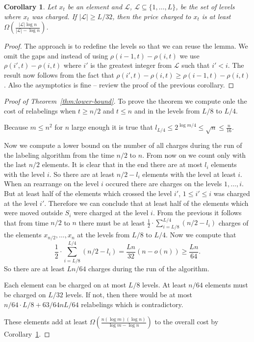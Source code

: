 \documentclass[11pt]{article} %
\newcommand{\density}[2]{\rho(#1, #2)}
\newtheorem{corollary}[definition]{Corollary}
\begin{document}
\begin{corollary}
\label{cor:element-charge}
Let $x_t$ be an element and $\mathcal{L}$, $\mathcal{L} \subseteq \{1, \dots, L\}$, be the set of levels where $x_t$ was charged.
If $|\mathcal{L}| \geq L/32$, then the price charged to $x_t$ is at least $\Omega\left(\frac{|\mathcal{L}| \log n}{|\mathcal{L}| - \log n}\right)$.
\end{corollary}
\begin{proof}
The approach is to redefine the levels so that we can reuse the lemma.
We omit the gaps and instead of using $\density{i - 1}{t} - \density{i}{t}$ we use $\density{i'}{t} - \density{i}{t}$ where $i'$ is the greatest integer from $\mathcal{L}$ such that $i' < i$.
The result now follows from the fact that $\density{i'}{t} - \density{i}{t} \geq \density{i - 1}{t} - \density{i}{t}$.
Also the asymptotics is fine -- review the proof of the previous corollary.
\end{proof}

\begin{proof}[Proof of Theorem~\ref{thm:lower-bound}]
To prove the theorem we compute onle the cost of relabelings when $t \geq n/2$ and $t \leq n$ and in the levels from $L/8$ to $L/4$.

Because $m \leq n^2$ for $n$ large enough it is true that $l_{L/4} \leq 2^{\log m / 4} \leq \sqrt{n} \leq \frac{n}{16}$.

Now we compute a lower bound on the number of all charges during the run of the labeling algorithm from the time $n/2$ to $n$.
From now on we count only with the last $n/2$ elements.
It is clear that in the end there are at most $l_i$ elements with the level $i$.
So there are at least $n/2 - l_i$ elements with the level at least $i$.
When an rearrange on the level $i$ occured there are charges on the levels $1, \dots, i$.
But at least half of the elements which crossed the level $i'$, $1 \leq i' \leq i$ was charged at the level $i'$.
Therefore we can conclude that at least half of the elements which were moved outside $S_i$ were charged at the level $i$.
From the previous it follows that from time $n/2$ to $n$ there must be at least $\frac{1}{2} \cdot \sum_{i = L/8}^{L/4}(n/2 - l_i)$ charges of the elements $x_{n/2}, \dots, x_n$ at the levels from $L/8$ to $L/4$.
Now we compute that
\[
\frac{1}{2} \cdot \sum_{i = L/8}^{L/4}(n/2 - l_i) = \frac{Ln}{32} (n - o(n)) \geq \frac{Ln}{64}.
\]
So there are at least $Ln/64$ charges during the run of the algorithm.

Each element can be charged on at most $L/8$ levels.
At least $n/64$ elements must be charged on $L/32$ levels.
If not, then there would be at most $n/64 \cdot L/8 + 63/64nL/64$ relabelings which is contradictory.

These elements add at least $\Omega\left(\frac{n(\log m)(\log n)}{\log m - \log n}\right)$ to the overall cost by Corollary~\ref{cor:element-charge}.
\end{proof}
\end{document}

